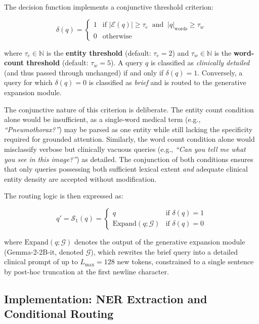 The decision function implements a conjunctive threshold criterion:

$$
\delta(q) = \begin{cases} 1 & \text{if } |\mathcal{E}(q)| \geq \tau_e \;\;\text{and}\;\; |q|_{\text{words}} \geq \tau_w \\ 0 & \text{otherwise} \end{cases}
$$

where $\tau_e \in \mathbb{N}$ is the \textbf{entity threshold} (default: $\tau_e = 2$) and $\tau_w \in \mathbb{N}$ is the \textbf{word-count threshold} (default: $\tau_w = 5$). A query $q$ is classified as \textit{clinically detailed} (and thus passed through unchanged) if and only if $\delta(q) = 1$. Conversely, a query for which $\delta(q) = 0$ is classified as \textit{brief} and is routed to the generative expansion module.

The conjunctive nature of this criterion is deliberate. The entity count condition alone would be insufficient, as a single-word medical term (e.g., \textit{``Pneumothorax?''}) may be parsed as one entity while still lacking the specificity required for grounded attention. Similarly, the word count condition alone would misclassify verbose but clinically vacuous queries (e.g., \textit{``Can you tell me what you see in this image?''}) as detailed. The conjunction of both conditions ensures that only queries possessing both sufficient lexical extent \textit{and} adequate clinical entity density are accepted without modification.

The routing logic is then expressed as:

$$
q' = \mathcal{S}_1(q) = \begin{cases} q & \text{if } \delta(q) = 1 \\ \text{Expand}(q; \mathcal{G}) & \text{if } \delta(q) = 0 \end{cases}
$$

where $\text{Expand}(q; \mathcal{G})$ denotes the output of the generative expansion module (Gemma-2-2B-it, denoted $\mathcal{G}$), which rewrites the brief query into a detailed clinical prompt of up to $L_{\max} = 128$ new tokens, constrained to a single sentence by post-hoc truncation at the first newline character.

\subsection{Implementation: NER Extraction and Conditional Routing}
\label{sec:3_2_4}

